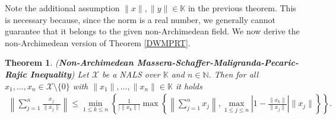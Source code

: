 \documentclass{amsart}
\newtheorem{theorem}{Theorem}[section]
\begin{document}
Note the additional assumption $\|x\|, \|y\| \in \mathbb{K}$ in the previous theorem. This is necessary because, since the norm is a real number, we generally cannot guarantee that it belongs to the given non-Archimedean field. We now derive the non-Archimedean version of Theorem \ref{DWMPRT}.
\begin{theorem} \label{NAMSMPRT} (\textbf{Non-Archimedean Massera-Schaffer-Maligranda-Pecaric-Rajic Inequality})
	Let $\mathcal{X}$ be a NALS over $\mathbb{K}$ and $n \in \mathbb{N}$. Then for all $x_1, \dots, x_n \in \mathcal{X}\setminus\{0\}$ with $\|x_1\|, \dots, \|x_n\| \in \mathbb{K}$ it holds
	\begin{align*}
		\left\|\sum_{j=1}^{n}\frac{x_j}{\|x_j\|}\right\|\leq \min_{1\leq k \leq n}\left\{\frac{1}{\big|\|x_k\|\big|} \max \left\{\left\|\sum_{j=1}^{n}x_j\right\|, \max_{1\leq j \leq n} \left|1-\frac{\|x_k\|}{\|x_j\|}\right|\|x_j\|\right\}\right\}.
	\end{align*}
\end{theorem}
\end{document}
